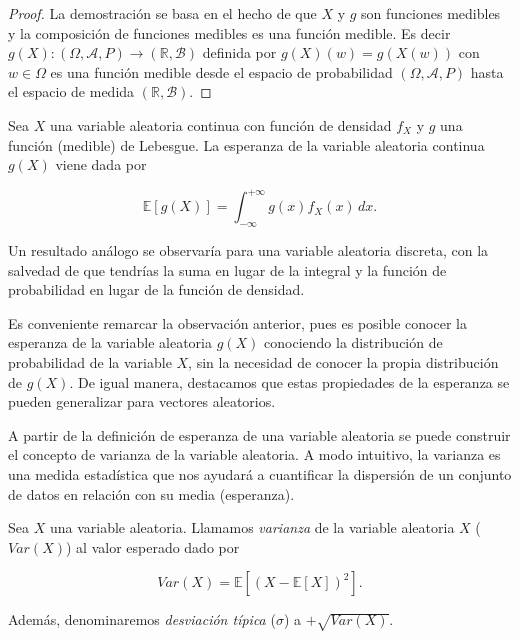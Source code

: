 \begin{proof}
    La demostración se basa en el hecho de que $X$ y $g$ son funciones medibles y la composición de funciones medibles es una función medible. Es decir $ g(X):(\Omega, \mathcal{A}, P) \to (\mathbb{R}, \mathcal{B}) $ definida por $g(X)(w) = g(X(w))$ con $w \in \Omega$ es una función medible desde el espacio de probabilidad $(\Omega, \mathcal{A}, P)$ hasta el espacio de medida $(\mathbb{R},\mathcal{B})$.\newline
\end{proof}

\begin{observacion}
    Sea $X$ una variable aleatoria continua con función de densidad $f_X$ y $g$ una función (medible) de Lebesgue. La esperanza de la variable aleatoria continua $g(X)$ viene dada por

    \[ \mathbb{E}[g(X)] =  \int_{-\infty}^{+\infty} g(x) f_{X}(x) \, dx. \]

    Un resultado análogo se observaría para una variable aleatoria discreta, con la salvedad de que tendrías la suma en lugar de la integral y la función de probabilidad en lugar de la función de densidad.\newline
\end{observacion}

Es conveniente remarcar la observación anterior, pues es posible conocer la esperanza de la variable aleatoria $g(X)$ conociendo la distribución de probabilidad de la variable $X$, sin la necesidad de conocer la propia distribución de $g(X)$. De igual manera, destacamos que estas propiedades de la esperanza se pueden generalizar para vectores aleatorios.\newline

A partir de la definición de esperanza de una variable aleatoria se puede construir el concepto de varianza de la variable aleatoria. A modo intuitivo, la varianza es una medida estadística que nos ayudará a cuantificar la dispersión de un conjunto de datos en relación con su media (esperanza).\newline

\begin{definicion}\label{def:varianza-variable-aleatoria}
    Sea $X$ una variable aleatoria. Llamamos \emph{varianza} de la variable aleatoria $X$ ($Var(X)$) al valor esperado dado por

    \[ Var(X) = \mathbb{E}[{(X - \mathbb{E}[X])}^2]. \]

    Además, denominaremos \emph{desviación típica} ($\sigma$) a $+\sqrt{Var(X)}$.\newline
\end{definicion}

